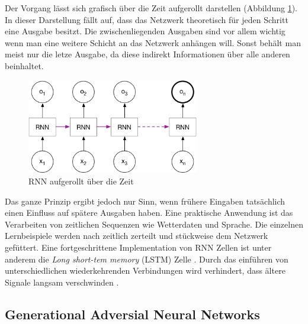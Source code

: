 Der Vorgang lässt sich grafisch über die Zeit aufgerollt darstellen (Abbildung \ref{img:rnn_unrolled}). In dieser Darstellung fällt auf, dass das Netzwerk theoretisch für jeden Schritt eine Ausgabe besitzt. Die zwischenliegenden Ausgaben sind vor allem wichtig wenn man eine weitere Schicht an das Netzwerk anhängen will. Sonst behält man meist nur die letze Ausgabe, da diese indirekt Informationen über alle anderen beinhaltet.\\
\begin{figure}[hbt]
	\centering
		\includegraphics[width=0.67\textwidth]{assets/rnn_unrolled.png}
	\caption{RNN aufgerollt über die Zeit}
	\label{img:rnn_unrolled}
\end{figure}

Das ganze Prinzip ergibt jedoch nur Sinn, wenn frühere Eingaben tatsächlich einen Einfluss auf spätere Ausgaben haben. Eine praktische Anwendung ist das Verarbeiten von zeitlichen Sequenzen wie Wetterdaten und Sprache. Die einzelnen Lernbeispiele werden nach zeitlich zerteilt und stückweise dem Netzwerk gefüttert.
Eine fortgeschrittene Implementation von RNN Zellen ist unter anderem die \textit{Long short-tem memory} (LSTM) Zelle \parencite{schmidhuber}. Durch das einführen von unterschiedlichen wiederkehrenden Verbindungen wird verhindert, dass ältere Signale langsam verschwinden \parencite{chollet}.
\subsection{Generational Adversial Neural Networks}